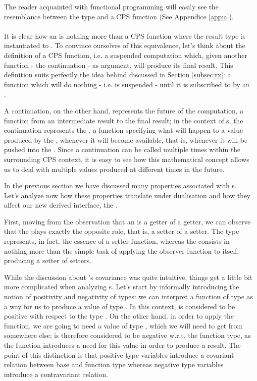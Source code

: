 The reader acquainted with functional programming will easily see the resemblance between the  type and a CPS function (See Appendice \ref{app:a}).\\

\\

It is clear how an  is nothing more than a CPS function where the result type  is instantiated to . To convince ourselves of this equivalence, let's think about the definition of a CPS function, i.e. a suspended computation which, given another function - the continuation - as argument, will produce its final result. This definition suits perfectly the idea behind  discussed in Section \ref{subsec:rx}: a function which will do nothing - i.e. is suspended - until it is subscribed to by an .

A continuation, on the other hand, represents the future of the computation, a function from an intermediate result to the final result\cite{newbern-monads}; in the context of s, the continuation represents the , a function specifying what will happen to a value produced by the , whenever it will become available, that is, whenever it will be pushed into the . Since a continuation can be called multiple times within the surrounding CPS context, it is easy to see how this mathematical concept allows us to deal with multiple values produced at different times in the future.

In the previous section we have discussed many properties associated with s. Let's analyze now how these properties translate under dualisation and how they affect our new derived interface, the .

First, moving from the observation that an  is a getter of a getter, we can observe that the  plays exactly the opposite role, that is, a setter of a setter. The type  represents, in fact, the essence of a setter function, whereas the  consists in nothing more than the simple task of applying the observer function to itself, producing a setter of setters. 

While the discussion about 's covariance was quite intuitive, things get a little bit more complicated when analyzing s. Let's start by informally introducing the notion of positivity and negativity of types: we can interpret a function of type  as a way for us to produce a value of type . In this context,  is considered to be positive with respect to the type . On the other hand, in order to apply the function, we are going to need a value of type , which we will need to get from somewhere else;  is therefore considered to be negative w.r.t. the function type, as the function introduces a need for this value in order to produce a result. The point of this distinction is that positive type variables introduce a covariant relation between base and function type whereas negative type variables introduce a contravariant relation.

